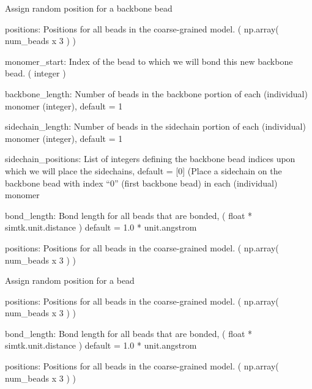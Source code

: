 \documentclass[letterpaper,10pt,english,openany,oneside]{sphinxmanual}
\begin{document}

\begin{fulllineitems}
\label{\detokenize{util:util.assign_backbone_beads}}
Assign random position for a backbone bead

positions: Positions for all beads in the coarse-grained model.
( np.array( num\_beads x 3 ) )

monomer\_start: Index of the bead to which we will bond this
new backbone bead.
( integer )

backbone\_length: Number of beads in the backbone
portion of each (individual) monomer (integer), default = 1

sidechain\_length: Number of beads in the sidechain
portion of each (individual) monomer (integer), default = 1

sidechain\_positions: List of integers defining the backbone
bead indices upon which we will place the sidechains,
default = {[}0{]} (Place a sidechain on the backbone bead with
index “0” (first backbone bead) in each (individual) monomer

bond\_length: Bond length for all beads that are bonded,
( float * simtk.unit.distance )
default = 1.0 * unit.angstrom

positions: Positions for all beads in the coarse-grained model.
( np.array( num\_beads x 3 ) )

\end{fulllineitems}


\begin{fulllineitems}
\label{\detokenize{util:util.assign_position}}
Assign random position for a bead

positions: Positions for all beads in the coarse-grained model.
( np.array( num\_beads x 3 ) )

bond\_length: Bond length for all beads that are bonded,
( float * simtk.unit.distance )
default = 1.0 * unit.angstrom

positions: Positions for all beads in the coarse-grained model.
( np.array( num\_beads x 3 ) )

\end{fulllineitems}
\end{document}
